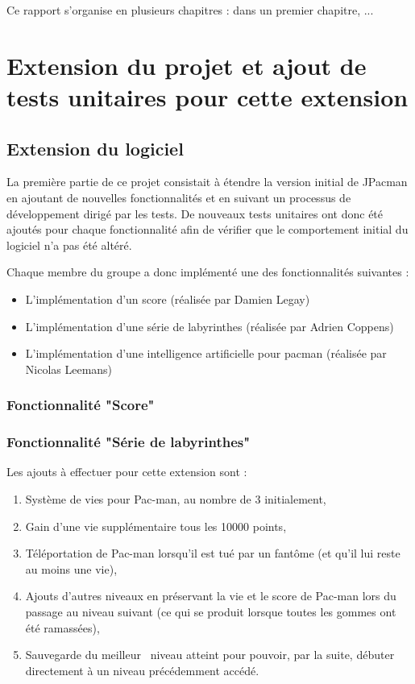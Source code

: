 \documentclass[12pt, openany]{report}
\begin{document}
 Ce rapport s'organise en plusieurs chapitres : dans un premier chapitre, ...
 
\section{Extension du projet et ajout de tests unitaires pour cette extension }

\subsection{Extension du logiciel}

La première partie de ce projet consistait à étendre la version initial de JPacman en ajoutant de nouvelles fonctionnalités et en suivant un processus de développement dirigé par les tests. De nouveaux tests unitaires ont donc été ajoutés pour chaque fonctionnalité afin de vérifier que le comportement initial du logiciel n’a pas été altéré. 

Chaque membre du groupe a donc implémenté une des fonctionnalités suivantes :
\begin{itemize}
\item L'implémentation d'un score (réalisée par Damien Legay)
\item L'implémentation d'une série de labyrinthes (réalisée par Adrien Coppens)
\item L'implémentation d'une intelligence artificielle pour pacman (réalisée par Nicolas Leemans)

\end{itemize}


\subsubsection{Fonctionnalité "Score"}\label{score}
\subsubsection{Fonctionnalité "Série de labyrinthes"}
Les ajouts à effectuer pour cette extension sont :
\begin{enumerate}
	\item Système de vies pour Pac-man, au nombre de 3 initialement,
	\item Gain d'une vie supplémentaire tous les 10000 points,
	\item Téléportation de Pac-man lorsqu'il est tué par un fantôme (et qu'il lui reste au moins une vie),
	\item Ajouts d'autres niveaux en préservant la vie et le score de Pac-man lors du passage au niveau suivant (ce qui se produit lorsque toutes les gommes ont été ramassées),
	\item Sauvegarde du \og meilleur \fg \, niveau atteint pour pouvoir, par la suite, débuter directement à un niveau précédemment accédé.
\end{enumerate} 
\end{document}
